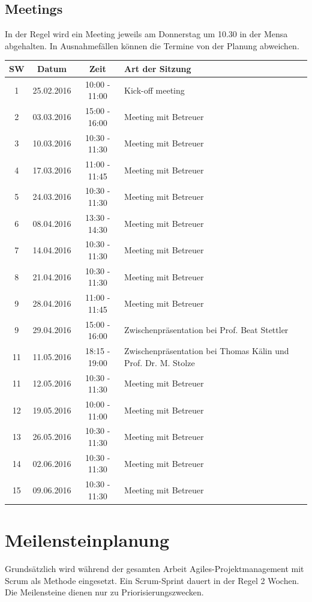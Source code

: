 \subsection{Meetings}
In der Regel wird ein Meeting jeweils am Donnerstag um 10.30 in der Mensa abgehalten. In Ausnahmefällen können die Termine von der Planung abweichen.
  \\[1\normalbaselineskip]
\begin{tabularx}{\textwidth}{|c|c|c|X|}
  \hline
  \textbf{SW} & \textbf{Datum} & \textbf{Zeit} & \textbf{Art der Sitzung} \\
  \hline \hline
  1 & 25.02.2016 & 10:00 - 11:00 &  Kick-off meeting \\
  2 & 03.03.2016 & 15:00 - 16:00 &  Meeting mit Betreuer \\
  3 & 10.03.2016 & 10:30 - 11:30 &  Meeting mit Betreuer \\
  4 & 17.03.2016 & 11:00 - 11:45 &  Meeting mit Betreuer \\
  5 & 24.03.2016 & 10:30 - 11:30 &  Meeting mit Betreuer \\
  6 & 08.04.2016 & 13:30 - 14:30 &  Meeting mit Betreuer \\
  7 & 14.04.2016 & 10:30 - 11:30 &  Meeting mit Betreuer \\
  8 & 21.04.2016 & 10:30 - 11:30 &  Meeting mit Betreuer \\
  9 & 28.04.2016 & 11:00 - 11:45 &  Meeting mit Betreuer \\
  9 & 29.04.2016 & 15:00 - 16:00 &  Zwischenpräsentation bei Prof. Beat Stettler \\
  11 & 11.05.2016 & 18:15 - 19:00 &  Zwischenpräsentation bei Thomas Kälin und Prof. Dr. M. Stolze \\
  11 & 12.05.2016 & 10:30 - 11:30 &  Meeting mit Betreuer \\
  12 & 19.05.2016 & 10:00 - 11:00 &  Meeting mit Betreuer \\
  13 & 26.05.2016 & 10:30 - 11:30 &  Meeting mit Betreuer \\
  14 & 02.06.2016 & 10:30 - 11:30 &  Meeting mit Betreuer \\
  15 & 09.06.2016 & 10:30 - 11:30 &  Meeting mit Betreuer \\
  \hline
\end{tabularx}
\newpage
\section{Meilensteinplanung}
Grundsätzlich wird während der gesamten Arbeit Agiles-Projektmanagement mit Scrum als Methode eingesetzt. Ein Scrum-Sprint dauert in der Regel 2 Wochen. Die Meilensteine dienen nur zu Priorisierungszwecken.

